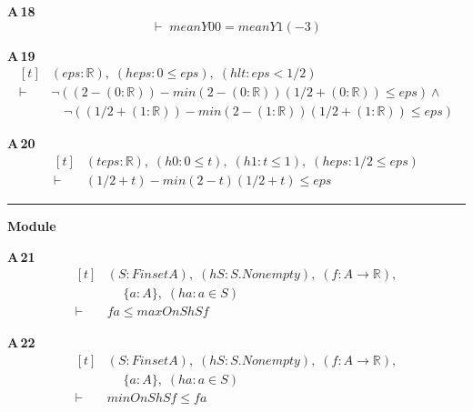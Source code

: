 \noindent\textbf{A\,18}\quad{}
{\footnotesize\[ \vdash\; \mathit{meanY} 0 0 = \mathit{meanY} 1 (-3) \]}

\noindent\textbf{A\,19}\quad{}
{\footnotesize\[ \begin{aligned}[t]
&(\mathit{eps} : \mathbb{R} ),\; (\mathit{heps} : 0 \leq \mathit{eps}),\; (\mathit{hlt} : \mathit{eps} < 1 / 2)\\
\vdash\;&\neg ((2 - (0:\mathbb{R} )) - \mathit{min} (2 - (0:\mathbb{R} )) (1 / 2 + (0:\mathbb{R} )) \leq \mathit{eps}) \wedge\\
&\quad \neg ((1 / 2 + (1:\mathbb{R} )) - \mathit{min} (2 - (1:\mathbb{R} )) (1 / 2 + (1:\mathbb{R} )) \leq \mathit{eps})
\end{aligned} \]}

\noindent\textbf{A\,20}\quad{}
{\footnotesize\[ \begin{aligned}[t]
&(\mathit{t} \mathit{eps} : \mathbb{R} ),\; (\mathit{h0} : 0 \leq \mathit{t}),\; (\mathit{h1} : \mathit{t} \leq 1),\; (\mathit{heps} : 1 / 2 \leq \mathit{eps})\\
\vdash\;&(1 / 2 + \mathit{t}) - \mathit{min} (2 - \mathit{t}) (1 / 2 + \mathit{t}) \leq \mathit{eps}
\end{aligned} \]}

\vspace{4pt}\noindent\rule{\columnwidth}{0.4pt}\par\vspace{2pt}
\noindent\textbf{Module }\par\vspace{3pt}

\noindent\textbf{A\,21}\quad{}
{\footnotesize\[ \begin{aligned}[t]
&(\mathit{S} : \mathit{Finset} \mathit{A}),\; (\mathit{hS} : \mathit{S}.\mathit{Nonempty}),\; (\mathit{f} : \mathit{A} \to \mathbb{R} ),\\
&\quad \; \{ \mathit{a} : \mathit{A}\},\; (\mathit{ha} : \mathit{a} \in \mathit{S})\\
\vdash\;&\mathit{f} \mathit{a} \leq \mathit{maxOn} \mathit{S} \mathit{hS} \mathit{f}
\end{aligned} \]}

\noindent\textbf{A\,22}\quad{}
{\footnotesize\[ \begin{aligned}[t]
&(\mathit{S} : \mathit{Finset} \mathit{A}),\; (\mathit{hS} : \mathit{S}.\mathit{Nonempty}),\; (\mathit{f} : \mathit{A} \to \mathbb{R} ),\\
&\quad \; \{ \mathit{a} : \mathit{A}\},\; (\mathit{ha} : \mathit{a} \in \mathit{S})\\
\vdash\;&\mathit{minOn} \mathit{S} \mathit{hS} \mathit{f} \leq \mathit{f} \mathit{a}
\end{aligned} \]}

